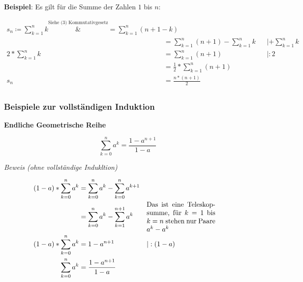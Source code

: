 \documentclass{article}
\begin{document}
\noindent
\textbf{Beispiel}: Es gilt für die Summe der Zahlen $1$ bis $n$:

\begin{align*}
  s_n \coloneqq \sum\limits_{k = 1}^n k \overset{\text{Siehe (3) Kommutativgesetz}}&{=} \sum\limits_{k = 1}^n (n + 1 - k)  \\
                                                                                   &= \sum\limits_{k = 1}^n (n + 1) - \sum\limits_{k = 1}^n k && | + \sum\limits_{k = 1}^n k \\
  2 * \sum\limits_{k = 1}^n k &=  \sum\limits_{k = 1}^n (n + 1)  && | : 2 \\
                                                                                   &= \frac{1}{2} * \sum\limits_{k = 1}^n (n + 1) \\
  s_n &= \frac{n * (n + 1)}{2} \\
\end{align*}

\subsubsection{Beispiele zur vollständigen Induktion}

\textbf{Endliche Geometrische Reihe}

\[
  \sum\limits_{k = 0}^n a^k = \frac{1 - a^{n + 1}}{1 - a}
\]

\emph{Beweis (ohne vollständige Indukltion)}


\begin{align*}
  (1 - a) * \sum\limits_{k = 0}^n a^k &= \sum\limits_{k = 0}^n a^k - \sum\limits_{k = 0}^n a^{k + 1} \\
                                      &= \sum\limits_{k = 0}^n a^k - \sum\limits_{k = 1}^{n + 1} a^k
                                      && \parbox{10em}{Das ist eine Teleskopsumme, für $k = 1$ bis $k = n$ stehen nur Paare $a^k - a^k$} \\
  (1 - a) * \sum\limits_{k = 0}^n a^k &= 1 - a^{n + 1} && | :(1 - a) \\
  \sum\limits_{k = 0}^n a^k &= \frac{1 - a^{n + 1}}{1 - a} \\
\end{align*}
\end{document}
